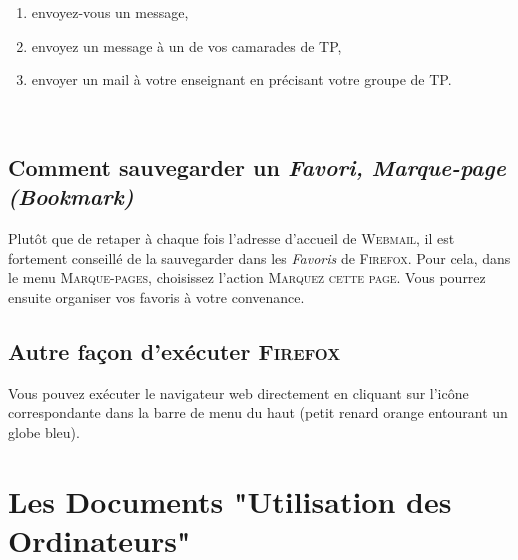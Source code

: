 \documentclass[a4paper,11pt]{article}
\newcommand{\netscape}{\textsc{Firefox}\xspace}
\begin{document}
\begin{maw}[Exercices]

\begin{enumerate}
  \item envoyez-vous un message,
  \item envoyez un message à un de vos camarades de TP,
  \item envoyer un mail à votre enseignant en précisant votre groupe de TP.

       \

\end{enumerate}
\end{maw}

\subsection{Comment sauvegarder un \textit{Favori, Marque-page (Bookmark)}}

Plutôt que de retaper à chaque fois l'adresse d'accueil de \textsc{Webmail},
il est fortement conseillé de la sauvegarder dans les \textit{Favoris} de
\netscape. Pour cela, dans le menu %
\textsc{Marque-pages}, 
choisissez l'action %
\textsc{Marquez cette page}.
Vous pourrez ensuite organiser vos favoris à votre convenance.

\subsection{Autre façon d'exécuter \netscape}

Vous pouvez exécuter le navigateur web directement en cliquant sur l'icône
correspondante dans la barre de menu du haut (petit renard orange entourant un
globe bleu).

\section{Les Documents "Utilisation des Ordinateurs"}
\end{document}
